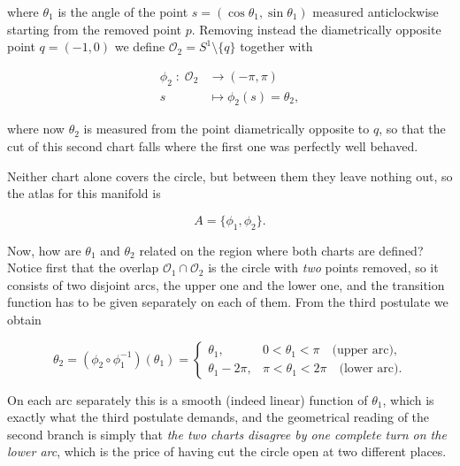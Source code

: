 \begin{enumerate}
        where $\theta_1$ is the angle of the point $s = (\cos\theta_1,\sin\theta_1)$ measured anticlockwise starting from the removed point $p$. Removing instead the diametrically opposite point $q = (-1,0)$ we define $\mathcal{O}_2 = S^1 \setminus \{q\}$ together with

        \begin{equation}
            \begin{split}
                \phi_2\;:\;\mathcal{O}_2 &\longrightarrow (-\pi,\pi)\\
                s &\longmapsto \phi_2(s) = \theta_2,
            \end{split}
        \end{equation}

        where now $\theta_2$ is measured from the point diametrically opposite to $q$, so that the cut of this second chart falls where the first one was perfectly well behaved.

        Neither chart alone covers the circle, but between them they leave nothing out, so the atlas for this manifold is

        \begin{equation}
            A = \{\phi_1,\phi_2\}.
        \end{equation}

        Now, how are $\theta_1$ and $\theta_2$ related on the region where both charts are defined? Notice first that the overlap $\mathcal{O}_1 \cap \mathcal{O}_2$ is the circle with \textit{two} points removed, so it consists of two disjoint arcs, the upper one and the lower one, and the transition function has to be given separately on each of them. From the third postulate we obtain

        \begin{equation}\label{eq:TransitionS1}
            \theta_2 = \left(\phi_2 \circ \phi_1^{-1}\right)(\theta_1) =
            \begin{cases}
                \theta_1, & 0 < \theta_1 < \pi \quad \text{(upper arc)},\\
                \theta_1 - 2\pi, & \pi < \theta_1 < 2\pi \quad \text{(lower arc)}.
            \end{cases}
        \end{equation}

        On each arc separately this is a smooth (indeed linear) function of $\theta_1$, which is exactly what the third postulate demands, and the geometrical reading of the second branch is simply that \textit{the two charts disagree by one complete turn on the lower arc}, which is the price of having cut the circle open at two different places.


\end{enumerate}
